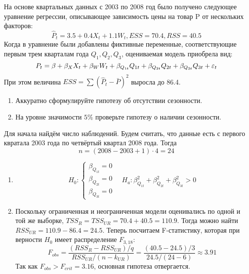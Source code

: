 \begin{problem} %
На основе квартальных данных с 2003 по 2008 год было получено следующее уравнение регрессии, описывающее зависимость цены на товар P от нескольких факторов:
\[
\hat P_t=3.5+0.4X_t+1.1W_t, ESS=70.4, RSS=40.5
\]
Когда в уравнение были добавлены фиктивные переменные, соответствующие первым
трем кварталам года $Q_1, Q_2, Q_3$, оцениваемая модель приобрела вид:
\[
P_t=\beta+\beta_X X_t+\beta_W W_t+\beta_{Q_{1t}} Q_{1t}+\beta_{Q_{2t}} Q_{2t}+\beta_{Q_{3t}} Q_{3t}+\varepsilon_t
\]
При этом величина $ESS = \sum (\hat P_t - \bar P)^2$ выросла до 86.4.

\begin{enumerate}
\item Аккуратно сформулируйте гипотезу об отсутствии сезонности.
\item На уровне значимости $5\%$ проверьте гипотезу о наличии сезонности.
\end{enumerate}



\begin{sol}
Для начала найдём число наблюдений. Будем считать, что данные есть с первого квратала 2003 года по четвёртый квартал 2008 года. Тогда
\[
n = (2008 -2003 + 1) \cdot 4 = 24
\]
\begin{enumerate}
\item
\[
H_0: \begin{cases}
\beta_{Q_{1t}} = 0 \\
\beta_{Q_{2t}} = 0 \\
\beta_{Q_{3t}} = 0
\end{cases}
\quad
H_a: \beta_{Q_{1t}}^2 + \beta_{Q_{2t}}^2 + \beta_{Q_{3t}}^2 >0
\]
\item Поскольку ограниченная и неограниченная модели оценивались по одной и той же выборке, $TSS_R = TSS_{UR} = 70.4 + 40.5 = 110.9$.
Тогда можно найти $RSS_{UR} = 110.9-86.4 = 24.5$. Теперь посчитаем F-статистику, которая при верности $H_0$ имеет распределение $F_{3, 18}$:
\[
F_{obs} = \frac{(RSS_{R} - RSS_{UR})/q}{RSS_{UR}/(n-k_{UR})} = \frac{(40.5-24.5)/3}{24.5/(24-6)} \approx 3.91
\]
Так как $F_{obs} > F_{crit} = 3.16$, основная гипотеза отвергается.
\end{enumerate}
\end{sol}
\end{problem}



